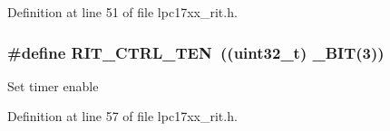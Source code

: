 \-Definition at line 51 of file lpc17xx\-\_\-rit.\-h.

\hypertarget{group___r_i_t___private___macros_gae2134d5c74919d6016d09b7d410b7b3d}{
\subsubsection[{\-R\-I\-T\-\_\-\-C\-T\-R\-L\-\_\-\-T\-E\-N}]{\setlength{\rightskip}{0pt plus 5cm}\#define {\bf \-R\-I\-T\-\_\-\-C\-T\-R\-L\-\_\-\-T\-E\-N}~((uint32\-\_\-t) \-\_\-\-B\-I\-T(3))}}\label{group___r_i_t___private___macros_gae2134d5c74919d6016d09b7d410b7b3d}
\-Set timer enable 

\-Definition at line 57 of file lpc17xx\-\_\-rit.\-h.

